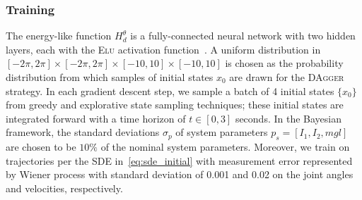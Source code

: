 \subsubsection{Training} 

The energy-like function $H_d^\theta$ is a fully-connected neural network with
two hidden layers, each with the \textsc{Elu} activation
function~\cite{clevert2015fast}. 
%
%
%
A uniform distribution in $[-2\pi, 2\pi] \times [-2\pi, 2\pi] \times [-10, 10]
\times [-10, 10]$ is chosen as the probability distribution from which samples
of initial states $x_0$ are drawn for the \textsc{DAgger} strategy.
%
In each gradient descent step, we sample a batch of 4 initial states $\{x_0\}$
from greedy and explorative state sampling techniques; these initial states are
integrated forward with a time horizon of $t \in [0,3]$ seconds. 
%
In the Bayesian framework, the standard deviations $\sigma_{p}$ of system
parameters $p_s = [I_1, I_2, mgl]$ are chosen to be $10\%$ of the nominal system
parameters.
%
Moreover, we train on trajectories per the SDE in~\eqref{eq:sde_initial} with
measurement error represented by Wiener process with standard deviation of 0.001
and 0.02 on the joint angles and velocities, respectively.
%
%
%

